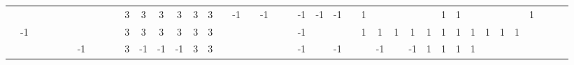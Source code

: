 \begin{table}[H]
{\begin{tabular}{ccccccccccccccccccccccccccccccccccccccccc}
   &    &                           &                           &                           &                           &                           &                           &                           &                           & \cellcolor[HTML]{3531FF}3 & \cellcolor[HTML]{3531FF}3 & \cellcolor[HTML]{3531FF}3 & \cellcolor[HTML]{3531FF}3 & \cellcolor[HTML]{3531FF}3 & \cellcolor[HTML]{3531FF}3 &                           & -1                        &                           & -1                        &                           &                           & -1                        & -1 & -1 &    & \cellcolor[HTML]{329A9D}1 &                           &                           &                           &                           & \cellcolor[HTML]{329A9D}1 & \cellcolor[HTML]{329A9D}1 &                           &                           &                           &                           & \cellcolor[HTML]{329A9D}1 &  &  &  \\
   & -1 &                           &                           &                           &                           &                           &                           &                           &                           & \cellcolor[HTML]{3531FF}3 & \cellcolor[HTML]{3531FF}3 & \cellcolor[HTML]{3531FF}3 & \cellcolor[HTML]{3531FF}3 & \cellcolor[HTML]{3531FF}3 & \cellcolor[HTML]{3531FF}3 &                           &                           &                           &                           &                           &                           & -1                        &    &    &    & \cellcolor[HTML]{329A9D}1 & \cellcolor[HTML]{329A9D}1 & \cellcolor[HTML]{329A9D}1 & \cellcolor[HTML]{329A9D}1 & \cellcolor[HTML]{329A9D}1 & \cellcolor[HTML]{329A9D}1 & \cellcolor[HTML]{329A9D}1 & \cellcolor[HTML]{329A9D}1 & \cellcolor[HTML]{329A9D}1 & \cellcolor[HTML]{329A9D}1 & \cellcolor[HTML]{329A9D}1 &                           &  &  &  \\
   &    &                           &                           &                           &                           & -1                        &                           &                           &                           & \cellcolor[HTML]{3531FF}3 & -1                        & -1                        & -1                        & \cellcolor[HTML]{3531FF}3 & \cellcolor[HTML]{3531FF}3 &                           &                           &                           &                           &                           &                           & -1                        &    & -1 &    &                           & -1                        &                           & -1                        & \cellcolor[HTML]{329A9D}1 & \cellcolor[HTML]{329A9D}1 & \cellcolor[HTML]{329A9D}1 & \cellcolor[HTML]{329A9D}1 &                           &                           &                           &                           &  &  &  \\

\end{tabular}}
\end{table}
